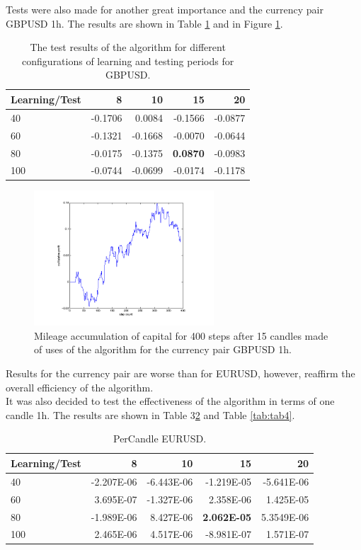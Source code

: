\documentclass[runningheads,a4paper]{llncs}
\begin{document}
Tests were also made for another great importance and the currency pair GBPUSD 1h. The results are shown in Table \ref{tab:tab2} and in Figure \ref{fig:fig9}.


\begin{table}[h!]
\centering
\caption{The test results of the algorithm for different configurations of learning and testing periods for GBPUSD.}
\label{tab:tab2}
\begin{tabular}{|l|r|r|r|r|} \hline
Learning/Test &	8	 &	10	 &	15 &		20 \\ \hline
40	 &	-0.1706	 &	0.0084 &		-0.1566	 &	-0.0877 \\ \hline
60	 &	-0.1321	 &	-0.1668 &		-0.0070	 &	-0.0644 \\ \hline
80	 &	-0.0175	 &	-0.1375 &		\textbf{0.0870}	 &	-0.0983 \\ \hline
100	 &	-0.0744	 &	-0.0699	 &	-0.0174	 &	-0.1178 \\ \hline
\end{tabular}
\end{table}
\FloatBarrier

\begin{figure}[h!]
\centering
\includegraphics[width = 0.6\textwidth]{figures/rys9.png}
\caption{Mileage accumulation of capital for 400 steps after 15 candles made of uses of the algorithm for the currency pair GBPUSD 1h.}
\label{fig:fig9}
\end{figure}
\FloatBarrier

Results for the currency pair are worse than for EURUSD, however, reaffirm the overall efficiency of the algorithm.\\

It was also decided to test the effectiveness of the algorithm in terms of one candle 1h. The results are shown in Table 3\ref{tab:tab3} and Table \ref{tab:tab4}.

\begin{table}[h!]
\centering
\caption{PerCandle EURUSD.}
\label{tab:tab3}
\begin{tabular}{|l|r|r|r|r|} \hline
Learning/Test &	8	 &	10 &		15	 &	20\\ \hline
40 &		-2.207E-06 &		-6.443E-06 &		-1.219E-05 &		-5.641E-06\\ \hline
60 &		3.695E-07 &		-1.327E-06 &		2.358E-06 &		1.425E-05\\ \hline
80 &		-1.989E-06 &		8.427E-06	 &	\textbf{2.062E-05} &		5.3549E-06\\ \hline
100	 &	2.465E-06 &		4.517E-06 &		-8.981E-07 &		1.571E-07\\ \hline
\end{tabular}
\end{table}
\FloatBarrier
\end{document}

